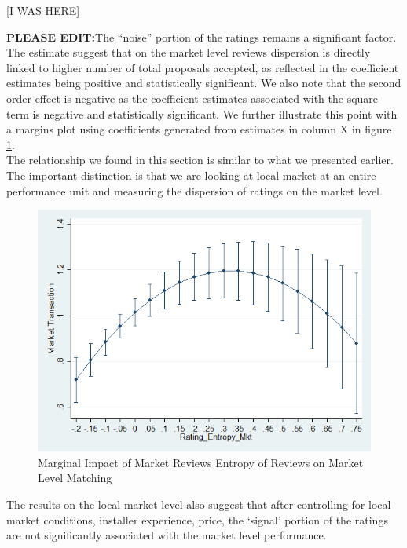 \documentclass[msom,blindrev]{informs3}
\begin{document}


[I WAS HERE]

\textbf{PLEASE EDIT:}The ``noise'' portion of the ratings remains a significant factor. The estimate suggest that on the market level reviews dispersion is directly linked to higher number of total proposals accepted, as reflected in the coefficient estimates being positive and statistically significant. We also note that the second order effect is negative as the coefficient estimates associated with the square term is negative and statistically significant. We further illustrate this point with a margins plot using coefficients generated from estimates in column X in figure \ref{marginsplot_mkt_entmkt}. \\
The relationship we found in this section is similar to what we presented earlier. The important distinction is that we are looking at local market at an entire performance unit and measuring the dispersion of ratings on the market level.




\begin{figure}
	\centering
	\includegraphics[width=0.7\linewidth]{marginsplot_entmkt.png}
	\caption{Marginal Impact of Market Reviews Entropy of Reviews on Market Level Matching}
	\label{marginsplot_mkt_entmkt}
\end{figure}

The results on the local market level also suggest that after controlling for local market conditions, installer experience, price, the `signal' portion of the ratings are not significantly associated with the market level performance.
\end{document}
